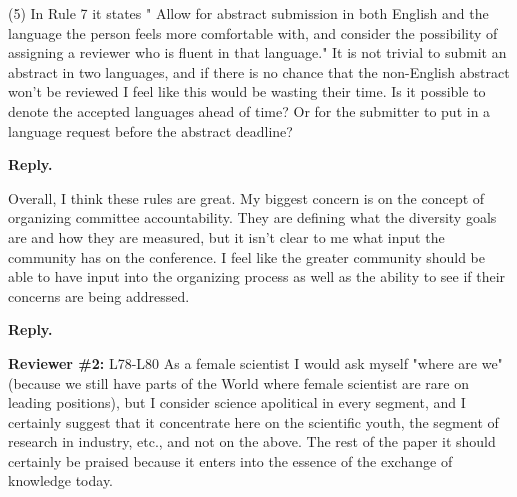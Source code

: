 \documentclass{article}
\newenvironment{Reply}{\noindent\color{BlueViolet}\textbf{Reply.}}{\vspace{1em}}
\begin{document}
(5) In Rule 7 it states " Allow for abstract submission in both English and the language the person feels more comfortable with, and consider the possibility of assigning a reviewer who is fluent in that language." It is not trivial to submit an abstract in two languages, and if there is no chance that the non-English abstract won't be reviewed I feel like this would be wasting their time. Is it possible to denote the accepted languages ahead of time? Or for the submitter to put in a language request before the abstract deadline?

\begin{Reply}
\end{Reply}

Overall, I think these rules are great. My biggest concern is on the concept of organizing committee accountability. They are defining what the diversity goals are and how they are measured, but it isn't clear to me what input the community has on the conference. I feel like the greater community should be able to have input into the organizing process as well as the ability to see if their concerns are being addressed.

\begin{Reply}
\end{Reply}

\textbf{Reviewer \#2:}
L78-L80 As a female scientist I would ask myself "where are we" (because we still have parts of the World where female scientist are rare on leading positions), but I consider science apolitical in every segment, and I certainly suggest that it concentrate here on the scientific youth, the segment of research in industry, etc., and not on the above.
The rest of the paper it should certainly be praised because it enters into the essence of the exchange of knowledge today.
\end{document}
